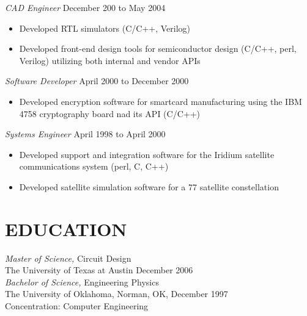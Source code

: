 \documentclass[margin]{res}
\begin{document}
\begin{resume}
{\sl CAD Engineer} \hfill December 200 to May 2004 \\
\begin{itemize}
	\item Developed RTL simulators (C/C++, Verilog)
	\item Developed front-end design tools for semiconductor design (C/C++, perl, Verilog) utilizing both internal and vendor APIs
\end{itemize}
{\sl Software Developer} \hfill April 2000 to December 2000 \\
\begin{itemize}
	\item Developed encryption software for smartcard manufacturing using the IBM 4758 cryptography board nad its API (C/C++)
\end{itemize}
{\sl Systems Engineer} \hfill April 1998 to April 2000 \\
\begin{itemize}
	\item Developed support and integration software for the Iridium satellite communications system (perl, C, C++)
	\item Developed satellite simulation software for a 77 satellite constellation
\end{itemize}
\section{EDUCATION} 
{\sl Master of Science,} Circuit Design\\
                The University of Texas at Austin 
                December 2006 \\

{\sl Bachelor of Science,} Engineering Physics\\
                The University of Oklahoma, Norman, OK, 
                December 1997 \\
                Concentration: Computer Engineering\\
\end{resume}
\end{document}
